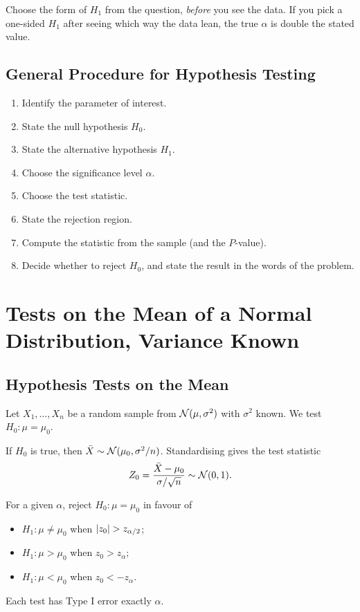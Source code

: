 Choose the form of $H_1$ from the question, \emph{before} you see the data. If you pick a one-sided $H_1$ after seeing which way the data lean, the true $\alpha$ is double the stated value.

\subsection{General Procedure for Hypothesis Testing}

\begin{definition}
\begin{enumerate}[label=\arabic*.]
  \item Identify the parameter of interest.
  \item State the null hypothesis $H_0$.
  \item State the alternative hypothesis $H_1$.
  \item Choose the significance level $\alpha$.
  \item Choose the test statistic.
  \item State the rejection region.
  \item Compute the statistic from the sample (and the $P$-value).
  \item Decide whether to reject $H_0$, and state the result in the words of the problem.
\end{enumerate}
\end{definition}

\section{Tests on the Mean of a Normal Distribution, Variance Known}

\subsection{Hypothesis Tests on the Mean}

Let $X_1,\dots,X_n$ be a random sample from $\mathcal{N}(\mu,\sigma^2)$ with $\sigma^2$ known. We test $H_0:\mu=\mu_0$.

If $H_0$ is true, then $\bar{X}\sim\mathcal{N}(\mu_0,\sigma^2/n)$. Standardising gives the test statistic
\[ Z_0=\frac{\bar{X}-\mu_0}{\sigma/\sqrt n}\sim\mathcal{N}(0,1). \]

\begin{theorem}[$z$-test]\label{thm:ztest}
For a given $\alpha$, reject $H_0:\mu=\mu_0$ in favour of
\begin{itemize}
  \item $H_1:\mu\ne\mu_0$ when $\lvert z_0\rvert>z_{\alpha/2}$;
  \item $H_1:\mu>\mu_0$ when $z_0>z_\alpha$;
  \item $H_1:\mu<\mu_0$ when $z_0<-z_\alpha$.
\end{itemize}
Each test has Type I error exactly $\alpha$.
\end{theorem}

